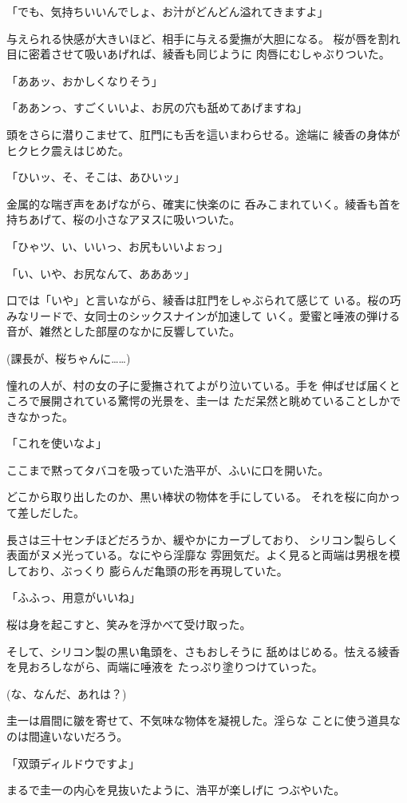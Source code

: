 ﻿\documentclass[
    book,tate,
    line_length=30zw,
    jafontsize=12pt,
    paper=b5j,
    landscape,
    ]{jlreq}
\begin{document}
「でも、気持ちいいんでしょ、お汁がどんどん溢れてきますよ」

与えられる快感が大きいほど、相手に与える愛撫が大胆になる。
桜が唇を割れ目に密着させて吸いあげれば、綾香も同じように
肉唇にむしゃぶりついた。

「ああッ、おかしくなりそう」

「ああンっ、すごくいいよ、お尻の穴も舐めてあげますね」

頭をさらに潜りこませて、肛門にも舌を這いまわらせる。途端に
綾香の身体がヒクヒク震えはじめた。

「ひいッ、そ、そこは、あひいッ」

金属的な喘ぎ声をあげながら、確実に快楽のに
呑みこまれていく。綾香も首を持ちあげて、桜の小さなアヌスに吸いついた。

「ひゃツ、い、いいっ、お尻もいいよぉっ」

「い、いや、お尻なんて、あああッ」

口では「いや」と言いながら、綾香は肛門をしゃぶられて感じて
いる。桜の巧みなリードで、女同士のシックスナインが加速して
いく。愛蜜と唾液の弾ける音が、雑然とした部屋のなかに反響していた。

(課長が、桜ちゃんに……)

憧れの人が、村の女の子に愛撫されてよがり泣いている。手を
伸ばせば届くところで展開されている驚愕の光景を、圭一は
ただ呆然と眺めていることしかできなかった。

「これを使いなよ」

ここまで黙ってタバコを吸っていた浩平が、ふいに口を開いた。

どこから取り出したのか、黒い棒状の物体を手にしている。
それを桜に向かって差しだした。

長さは三十センチほどだろうか、緩やかにカーブしており、
シリコン製らしく表面がヌメ光っている。なにやら淫靡な
雰囲気だ。よく見ると両端は男根を模しており、ぶっくり
膨らんだ亀頭の形を再現していた。

「ふふっ、用意がいいね」

桜は身を起こすと、笑みを浮かべて受け取った。

そして、シリコン製の黒い亀頭を、さもおしそうに
舐めはじめる。怯える綾香を見おろしながら、両端に唾液を
たっぷり塗りつけていった。

(な、なんだ、あれは？)

圭一は眉間に皺を寄せて、不気味な物体を凝視した。淫らな
ことに使う道具なのは間違いないだろう。

「双頭ディルドウですよ」

まるで圭一の内心を見抜いたように、浩平が楽しげに
つぶやいた。
\end{document}
